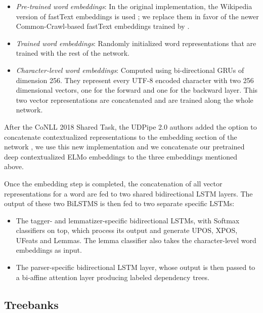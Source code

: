\begin{itemize}
    \item \emph{Pre-trained word embeddings}: In the original implementation, the Wikipedia version of fastText embeddings is used \citep{bojanowski-etal-2017-enriching}; we replace them in favor of the newer Common-Crawl-based fastText embeddings trained by \citet{grave-etal-2018-learning}.
    \item \emph{Trained word embeddings}: Randomly initialized word representations that are trained with the rest of the network.
    \item \emph{Character-level word embeddings}: Computed using bi-directional GRUs of dimension 256. They represent every UTF-8 encoded character with two 256 dimensional vectors, one for the forward and one for the backward layer. This two vector representations are concatenated and are trained along the whole network.
\end{itemize}

After the CoNLL 2018 Shared Task, the UDPipe 2.0 authors added the option to concatenate contextualized representations to the embedding section of the network \citep{straka-strakova-2019-evaluating}, we use this new implementation and we concatenate our pretrained deep contextualized ELMo embeddings to the three embeddings mentioned above.

Once the embedding step is completed, the concatenation of all vector representations for a word are fed to two shared bidirectional LSTM \citep{hochreiter-schmidhuber-1997-long} layers. The output of these two BiLSTMS is then fed to two separate specific LSTMs:
\begin{itemize}
    \item The tagger- and lemmatizer-specific bidirectional LSTMs, with Softmax classifiers on top, which process its output and generate UPOS, XPOS, UFeats and Lemmas. The lemma classifier also takes the character-level word embeddings as input.

    \item The parser-specific bidirectional LSTM layer, whose output is then passed to a bi-affine attention layer \citep{dozat-manning-2017-deep} producing labeled dependency trees.
\end{itemize}

\subsection{Treebanks}

